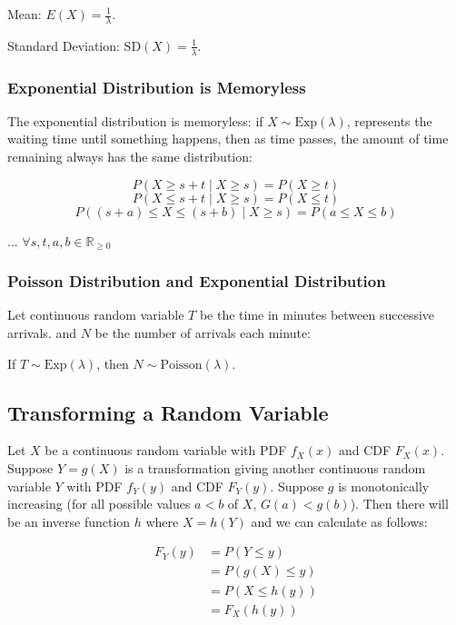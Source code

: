 Mean: $E(X) = \frac{1}{\lambda}$.

Standard Deviation: $\text{SD}(X) = \frac{1}{\lambda}$.

\subsubsection*{Exponential Distribution is Memoryless}

The exponential distribution is memoryless: if $X \sim \text{Exp}(\lambda)$, represents the waiting time until something happens, then as time passes, the amount of time remaining always has the same distribution:

$$ P(X \geq s + t \mid X \geq s) = P(X \geq t) $$
$$ P(X \leq s + t \mid X \geq s) = P(X \leq t) $$
$$ P((s+a) \leq X \leq (s+b) \mid X \geq s) = P(a \leq X \leq b) $$

... $\forall s,t,a,b \in \mathbb{R}_{\geq 0}$

\subsubsection*{Poisson Distribution and Exponential Distribution}

Let continuous random variable $T$ be the time in minutes between successive arrivals. and $N$ be the number of arrivals each minute:

If $T\sim \text{Exp}(\lambda)$, then $N \sim \text{Poisson}(\lambda)$.

\subsection*{Transforming a Random Variable}

Let $X$ be a continuous random variable with PDF $f_X(x)$ and CDF $F_X(x)$.
Suppose $Y=g(X)$ is a transformation giving another continuous random variable $Y$ with PDF $f_Y(y)$ and CDF $F_Y(y)$.
Suppose $g$ is monotonically increasing (for all possible values $a<b$ of $X$, $G(a) < g(b)$).
Then there will be an inverse function $h$ where $X = h(Y)$ and we can calculate as follows:

\begin{align*}
      F_Y(y) & = P(Y \leq y)    \\
             & = P(g(X)\leq y)  \\
             & = P(X \leq h(y)) \\
             & = F_X(h(y))
\end{align*}

